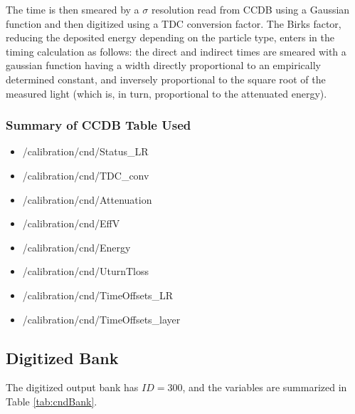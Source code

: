 The time is then smeared by a $\sigma$ resolution read from CCDB using a Gaussian function and then digitized using a TDC conversion factor.
The Birks factor, reducing the deposited
energy depending on the particle type, enters in the timing calculation as
follows: the direct and indirect times are smeared with a gaussian
function having a width directly proportional to an empirically determined
constant, and inversely proportional to the square root of the measured
light (which is, in turn, proportional to the attenuated energy).

\subsubsection{Summary of CCDB Table Used}
\begin{itemize}
	\item /calibration/cnd/Status\_LR
	\item /calibration/cnd/TDC\_conv
	\item /calibration/cnd/Attenuation
	\item /calibration/cnd/EffV
	\item /calibration/cnd/Energy
	\item /calibration/cnd/UturnTloss
	\item /calibration/cnd/TimeOffsets\_LR
	\item /calibration/cnd/TimeOffsets\_layer
\end{itemize}



\subsection{Digitized Bank}
The digitized output bank has $ID=300$, and the variables are summarized in Table \ref{tab:cndBank}.

